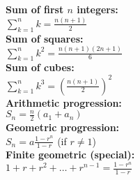 \textbf{Sum of first $n$ integers:} \\[1mm]
$\displaystyle \sum_{k=1}^n k = \frac{n(n+1)}{2}$ \\

\textbf{Sum of squares:} \\[1mm]
$\displaystyle \sum_{k=1}^n k^2 = \frac{n(n+1)(2n+1)}{6}$ \\

\textbf{Sum of cubes:} \\[1mm]
$\displaystyle \sum_{k=1}^n k^3 = \left(\frac{n(n+1)}{2}\right)^2$ \\

\textbf{Arithmetic progression:} \\[1mm]
$S_n = \frac{n}{2}(a_1 + a_n)$ \\

\textbf{Geometric progression:} \\[1mm]
$S_n = a\frac{1-r^n}{1-r}$ \quad (if $r\ne 1$) \\

\textbf{Finite geometric (special):} \\[1mm]
$1 + r + r^2 + \dots + r^{n-1} = \frac{1-r^n}{1-r}$ \\